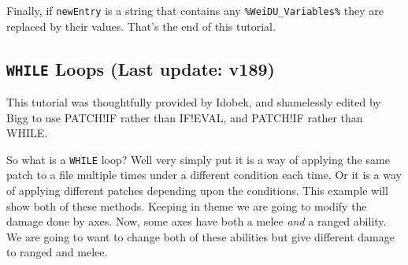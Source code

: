 \documentclass{article}
\def\ttref#1{\ahrefloc{#1}{\tt #1}}
\def\DEFINE#1{{\tt \bf #1}\label{#1}\index{#1}}
\def\t#1{{\tt #1}}
\begin{document}
%
%
%
%

Finally, if \t{newEntry} is a string that contains any
\t{\%WeiDU\_Variables\%} they are replaced by their values.
That's the end of this tutorial.

\subsection{\DEFINE{WHILE} Loops (Last update: v189)}

This tutorial was thoughtfully provided by Idobek, and shamelessly edited
by Bigg to use PATCH!IF rather than IF!EVAL, and PATCH!IF rather than WHILE.

So what is a \t{WHILE} loop? Well very simply put it is a way of
applying the same patch to a file multiple times under a different
condition each time. Or it is a way of applying different patches depending
upon the conditions. This example will show both of these methods. Keeping
in theme we are going to modify the damage done by axes. Now, some axes
have both a melee \emph{and} a ranged ability. We are going to want to
change both of these abilities but give different damage to ranged and
melee.
\end{document}
